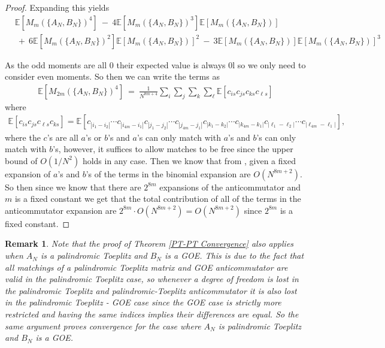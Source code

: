 \documentclass[11pt,reqno]{amsart}
\numberwithin{equation}{section}
\theoremstyle{plain}
\newtheorem{rem}[thm]{Remark}
\newcommand{\E}[1]{\mathbb{E}[#1]}
\begin{document}
\begin{proof}
Expanding this yields
\begin{align}
&\E{M_m(\{A_N,B_N\})^4}\ - \ 4\E{M_m(\{A_N,B_N\})^3}\E{M_m(\{A_N,B_N\})}\nonumber\\&\ + \ 6\E{M_m(\{A_N,B_N\})^2}\E{M_m(\{A_N,B_N\})}^2\ - \ 3\E{M_m(\{A_N,B_N\})}\E{M_m(\{A_N,B_N\})}^3
\end{align}

As the odd moments are all $0$ their expected value is always $0$l so we only need to consider even moments. So then we can write the terms as 
\begin{align}
\E{M_{2m}(\{A_N,B_N\})^4}\ = \ \frac{1}{N^{8m+4}}\sum_i\sum_j\sum_k\sum_\ell\E{c_{is}c_{js}c_{k s}c_{\ell s}}
\end{align}
where 
\begin{align}
\E{c_{is}c_{js}c_{\ell s}c_{ks}}=\E{c_{|i_1-i_2|}\cdots c_{|i_{4m}-i_1|}c_{|j_1-j_2|}\cdots c_{|j_{4m}-j_1|}c_{|k_1-k_2|}\cdots c_{|k_{4m}-k_1|}c_{|\ell_1-\ell_2|}\cdots c_{|\ell_{4m}-\ell_1|}},
\end{align}
where the $c$'s are all $a$'s or $b$'s and $a$'s can only match with $a$'s and $b$'s can only match with $b$'s, however, it suffices to allow matches to be free since the upper bound of $O(1/N^2)$ holds in any case. Then we know that from \cite{Toeplitz}, given a fixed expansion of $a$'s and $b$'s of the terms in the binomial expansion are $O(N^{8m+2})$. So then since we know that there are $2^{8m}$ expansions of the anticommutator and $m$ is a fixed constant we get that the total contribution of all of the terms in the anticommutator expansion are $2^{8m}\cdot O(N^{8m+2})=O(N^{8m+2})$ since $2^{8m}$ is a fixed constant.
\end{proof}

\begin{rem}
Note that the proof of Theorem \ref{PT-PT Convergence} also applies when $A_N$ is a palindromic Toeplitz and $B_N$ is a GOE. This is due to the fact that all matchings of a palindromic Toeplitz matrix and GOE anticommutator are valid in the palindromic Toeplitz case, so whenever a degree of freedom is lost in the palindromic Toeplitz and palindromic-Toeplitz anticommutator it is also lost in the palindromic Toeplitz - GOE case since the GOE case is strictly more restricted and having the same indices implies their differences are equal. So the same argument proves convergence for the case where $A_N$ is palindromic Toeplitz and $B_N$ is a GOE.
\end{rem}
\end{document}
